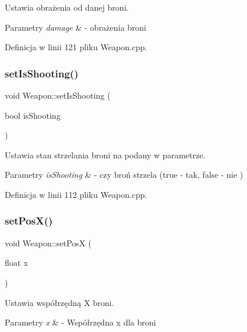 Ustawia obrażenia od danej broni. 


\begin{DoxyParams}{Parametry}
{\em damage} & -\/ obrażenia broni \\
\hline
\end{DoxyParams}


Definicja w linii 121 pliku Weapon.\+cpp.

\mbox{\label{class_weapon_abadbad398e52fb1ef6364cd2e0d2defb}} 
\subsubsection{\texorpdfstring{set\+Is\+Shooting()}{setIsShooting()}}
{\footnotesize\ttfamily void Weapon\+::set\+Is\+Shooting (\begin{DoxyParamCaption}\item[{bool}]{is\+Shooting }\end{DoxyParamCaption})}



Ustawia stan strzelania broni na podany w parametrze. 


\begin{DoxyParams}{Parametry}
{\em is\+Shooting} & -\/ czy broń strzela (true -\/ tak, false -\/ nie ) \\
\hline
\end{DoxyParams}


Definicja w linii 112 pliku Weapon.\+cpp.

\mbox{\label{class_weapon_a889af631d759a2911045d699d6801623}} 
\subsubsection{\texorpdfstring{set\+Pos\+X()}{setPosX()}}
{\footnotesize\ttfamily void Weapon\+::set\+PosX (\begin{DoxyParamCaption}\item[{float}]{x }\end{DoxyParamCaption})}



Ustawia współrzędną X broni. 


\begin{DoxyParams}{Parametry}
{\em x} & -\/ Współrzędna x dla broni \\
\hline
\end{DoxyParams}


